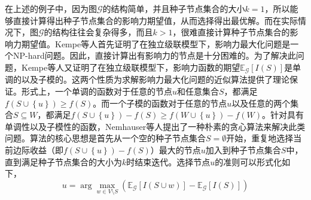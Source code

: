 在上述的例子中，因为图$\mathcal{G}$的结构简单，并且种子节点集合的大小$k=1$，所以能够直接计算得出种子节点集合的影响力期望值，从而选择得出最优解。而在实际情况下，图$\mathcal{G}$的结构往往会复杂得多，而且$k>1$，很难直接计算种子节点集合的影响力期望值。Kempe等人首先证明了在独立级联模型下，影响力最大化问题是一个NP-hard问题。因此，直接计算出有影响力的节点是十分困难的。为了解决此问题，Kempe等人又证明了在独立级联模型下，影响力函数的期望$\mathbb{E}_\mathcal{G}\left[I\left(S\right)\right]$是单调的以及子模的。这两个性质为求解影响力最大化问题的近似算法提供了理论保证。形式上，一个单调的函数对于任意的节点$u$和任意集合$S$，都满足$f\left(S\cup\left\{u\right\}\right) \geq f\left(S\right)$。而一个子模的函数对于任意的节点$u$以及任意的两个集合$S \subseteq W$，都满足$f\left(S\cup\left\{u\right\}\right) - f\left(S\right) \geq f\left(W\cup\left\{u\right\}\right) - f\left(W\right)$。针对具有单调性以及子模性的函数，Nemhauser等人提出了一种朴素的贪心算法来解决此类问题。算法的核心思想是首先从一个空的种子节点集合$S=\emptyset$开始，重复地选择当前边际收益（即$f\left(S\cup\left\{u\right\}\right) - f\left(S\right)$）最大的节点$u$加入到种子节点集合$S$中，直到满足种子节点集合的大小为$k$时结束迭代。选择节点$u$的准则可以形式化如下，
\begin{equation}\label{eq:greedyIM}
    u=\arg\max\limits_{w \in V \setminus S}\left({\mathbb{E}_\mathcal{G}\left[I\left(S\cup w\right)\right]-\mathbb{E}_\mathcal{G}\left[I\left(S\right)\right]}\right)
\end{equation}


